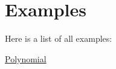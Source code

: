 \section{Examples}
Here is a list of all examples\+:\begin{DoxyCompactItemize}
\item 
\mbox{\hyperlink{_polynomial-example}{Polynomial}}
\end{DoxyCompactItemize}

